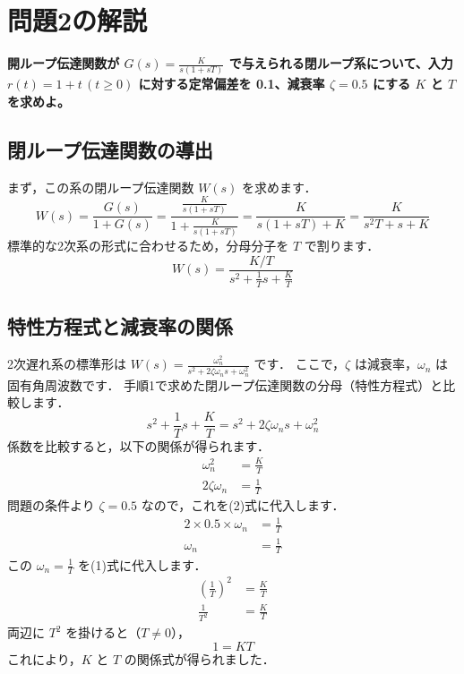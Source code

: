 \documentclass[11pt,a4paper]{ltjsarticle}
\begin{document}
\title{}
\author{  5年 XX番 }
\date{2025年8月4日}
\maketitle
\thispagestyle{fancy}

\section{問題2の解説}
\textbf{開ループ伝達関数が $G(s)=\frac{K}{s(1+sT)}$ で与えられる閉ループ系について、入力 $r(t)=1+t \, (t \ge 0)$ に対する定常偏差を 0.1、減衰率 $\zeta=0.5$ にする $K$ と $T$ を求めよ。}

\subsection{閉ループ伝達関数の導出}
まず，この系の閉ループ伝達関数 $W(s)$ を求めます．
\begin{equation*}
    W(s) = \frac{G(s)}{1+G(s)} = \frac{\frac{K}{s(1+sT)}}{1+\frac{K}{s(1+sT)}} = \frac{K}{s(1+sT)+K} = \frac{K}{s^2T+s+K}
\end{equation*}
標準的な2次系の形式に合わせるため，分母分子を $T$ で割ります．
\begin{equation*}
    W(s) = \frac{K/T}{s^2 + \frac{1}{T}s + \frac{K}{T}}
\end{equation*}

\subsection{特性方程式と減衰率の関係}
2次遅れ系の標準形は $W(s) = \frac{\omega_n^2}{s^2+2\zeta\omega_n s + \omega_n^2}$ です．
ここで，$\zeta$ は減衰率，$\omega_n$ は固有角周波数です．
手順1で求めた閉ループ伝達関数の分母（特性方程式）と比較します．
\begin{equation*}
    s^2 + \frac{1}{T}s + \frac{K}{T} = s^2+2\zeta\omega_n s + \omega_n^2
\end{equation*}
係数を比較すると，以下の関係が得られます．
\begin{align}
    \omega_n^2 &= \frac{K}{T} \\
    2\zeta\omega_n &= \frac{1}{T}
\end{align}
問題の条件より $\zeta=0.5$ なので，これを(2)式に代入します．
\begin{align*}
    2 \times 0.5 \times \omega_n &= \frac{1}{T} \\
    \omega_n &= \frac{1}{T}
\end{align*}
この $\omega_n = \frac{1}{T}$ を(1)式に代入します．
\begin{align*}
    \left(\frac{1}{T}\right)^2 &= \frac{K}{T} \\
    \frac{1}{T^2} &= \frac{K}{T}
\end{align*}
両辺に $T^2$ を掛けると（$T \neq 0$），
\begin{equation*}
    1 = KT
\end{equation*}
これにより，$K$ と $T$ の関係式が得られました．
\end{document}
